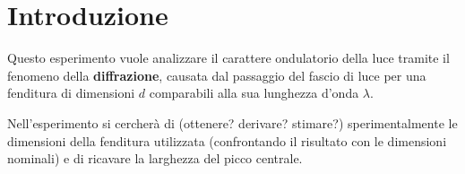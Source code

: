 \documentclass[../main.tex]{subfiles}
\begin{document}
\section{Introduzione}

Questo esperimento vuole analizzare il carattere ondulatorio della luce tramite il fenomeno della \textbf{diffrazione}, causata dal passaggio del fascio di luce per una fenditura di dimensioni $d$ comparabili alla sua lunghezza d'onda $\lambda$.



Nell'esperimento si cercherà di ({\color{red}ottenere? derivare? stimare?}) sperimentalmente le dimensioni della fenditura utilizzata (confrontando il risultato con le dimensioni nominali) e di ricavare la larghezza del picco centrale. %
\end{document}

